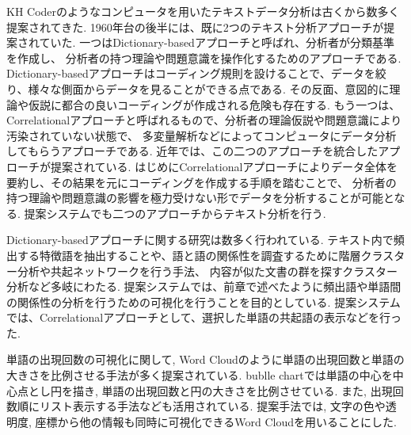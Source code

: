 \documentclass[syuuron]{kuee}
\begin{document}
		KH Coderのようなコンピュータを用いたテキストデータ分析は古くから数多く提案されてきた. 
		1960年台の後半には、既に2つのテキスト分析アプローチが提案されていた. 
		一つはDictionary-basedアプローチと呼ばれ、分析者が分類基準を作成し、
		分析者の持つ理論や問題意識を操作化するためのアプローチである. 
		Dictionary-basedアプローチはコーディング規則を設けることで、データを絞り、様々な側面からデータを見ることができる点である. 
		その反面、意図的に理論や仮説に都合の良いコーディングが作成される危険も存在する. 
		もう一つは、Correlationalアプローチと呼ばれるもので、分析者の理論仮説や問題意識により汚染されていない状態で、
		多変量解析などによってコンピュータにデータ分析してもらうアプローチである. 
		近年では、この二つのアプローチを統合したアプローチが提案されている\cite{kh1}. 
		はじめにCorrelationalアプローチによりデータ全体を要約し、その結果を元にコーディングを作成する手順を踏むことで、
		分析者の持つ理論や問題意識の影響を極力受けない形でデータを分析することが可能となる. 
		提案システムでも二つのアプローチからテキスト分析を行う. 
		
		Dictionary-basedアプローチに関する研究は数多く行われている. 
		テキスト内で頻出する特徴語を抽出することや、語と語の関係性を調査するために階層クラスター分析や共起ネットワークを行う手法、
		内容が似た文書の群を探すクラスター分析など多岐にわたる. 
		提案システムでは、前章で述べたように頻出語や単語間の関係性の分析を行うための可視化を行うことを目的としている. 
		提案システムでは、Correlationalアプローチとして、選択した単語の共起語の表示などを行った. 
		
		単語の出現回数の可視化に関して, Word Cloudのように単語の出現回数と単語の大きさを比例させる手法が多く提案されている. 
		bublle chartでは単語の中心を中心点とし円を描き, 単語の出現回数と円の大きさを比例させている. 
		また, 出現回数順にリスト表示する手法なども活用されている. 
		提案手法では, 文字の色や透明度, 座標から他の情報も同時に可視化できるWord Cloudを用いることにした. 
		
\end{document}

